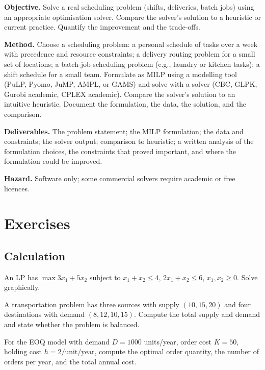 \begin{project}
\textbf{Objective.} Solve a real scheduling problem (shifts, deliveries, batch jobs) using an appropriate optimisation solver. Compare the solver's solution to a heuristic or current practice. Quantify the improvement and the trade-offs.

\textbf{Method.} Choose a scheduling problem: a personal schedule of tasks over a week with precedence and resource constraints; a delivery routing problem for a small set of locations; a batch-job scheduling problem (e.g., laundry or kitchen tasks); a shift schedule for a small team. Formulate as MILP using a modelling tool (PuLP, Pyomo, JuMP, AMPL, or GAMS) and solve with a solver (CBC, GLPK, Gurobi academic, CPLEX academic). Compare the solver's solution to an intuitive heuristic. Document the formulation, the data, the solution, and the comparison.

\textbf{Deliverables.} The problem statement; the MILP formulation; the data and constraints; the solver output; comparison to heuristic; a written analysis of the formulation choices, the constraints that proved important, and where the formulation could be improved.

\textbf{Hazard.} Software only; some commercial solvers require academic or free licences.
\end{project}

\section{Exercises}

\subsection*{Calculation}

\begin{exercise}
An LP has $\max 3x_1 + 5x_2$ subject to $x_1 + x_2 \leq 4$, $2x_1 + x_2 \leq 6$, $x_1, x_2 \geq 0$. Solve graphically.
\end{exercise}

\begin{exercise}
A transportation problem has three sources with supply $(10, 15, 20)$ and four destinations with demand $(8, 12, 10, 15)$. Compute the total supply and demand and state whether the problem is balanced.
\end{exercise}

\begin{exercise}
For the EOQ model with demand $D = 1000$ units/year, order cost $K = 50$, holding cost $h = 2/\text{unit/year}$, compute the optimal order quantity, the number of orders per year, and the total annual cost.
\end{exercise}

